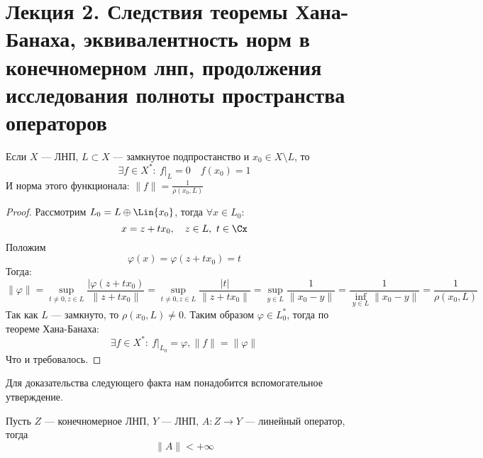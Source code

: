\newpage
\section{Лекция 2. Следствия теоремы Хана-Банаха, эквивалентность норм в конечномерном лнп, продолжения исследования полноты пространства операторов}
\begin{claim}\label{cl:hb-con1}
	Если $X$ --- ЛНП, $L \subset X$ --- замкнутое подпростанство и $x_0 \in X \setminus L$, то 
	$$
	\exists f \in X^*: \ f |_{L} = 0 \quad f(x_0) = 1
	$$
	И норма этого функционала: $\|f\| = \frac{1}{\rho(x_0, L)}$
\end{claim}
\begin{proof}
	Рассмотрим $L_0 = L \oplus \Lin\{x_0\}$, тогда $\forall x \in L_0$:
	$$
	x = z + tx_0, \quad z \in L, \ t \in \Cx
	$$
	Положим 
	$$
	\varphi (x) = \varphi(z + tx_0) = t
	$$
	Тогда:
	$$
	\|\varphi\| = \sup\limits_{ t \neq 0, z \in L} \frac{|\varphi(z + t x_0)}{\|z + t x_0\|} = \sup\limits_{ t \neq 0, z \in L} \frac{|t|}{\|z + tx_0\|} = \sup\limits_{ y \in L} \frac{1}{\|x_0 - y\|} = \frac{1}{\inf\limits_{ y \in L} \|x_0 - y\|} = \frac{1}{\rho(x_0, L)}
	$$
	Так как $L$ --- замкнуто, то $\rho(x_0, L) \neq 0$. Таким образом $\varphi \in L_0^*$, тогда по теореме Хана-Банаха:
	$$
	\exists f \in X^*: \ f|_{L_0} = \varphi, \|f\| = \|\varphi\|
	$$
	Что и требовалось.
\end{proof}
Для доказательства следующего факта нам понадобится вспомогательное утверждение.
\begin{claim}
	Пусть $Z$ --- конечномерное ЛНП, $Y$ --- ЛНП, $A : Z \to Y $ --- линейный оператор, тогда
	$$
	 \|A\| < +\infty
	$$
\end{claim}
